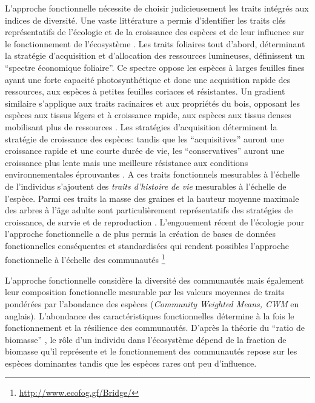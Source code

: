 \documentclass[
  11pt,
  french,
  A4paper,
  extrafontsizes,onecolumn,openright
  ]{memoir}
\begin{document}
L'approche fonctionnelle nécessite de choisir judicieusement les traits
intégrés aux indices de diversité. Une vaste littérature a permis
d'identifier les traits clés représentatifs de l'écologie et de la
croissance des espèces et de leur influence sur le fonctionnement de
l'écosystème \autocite{Reich2014}. Les traits foliaires tout d'abord,
déterminant la stratégie d'acquisition et d'allocation des ressources
lumineuses, définissent un ``spectre économique foliaire''. Ce spectre
oppose les espèces à larges feuilles fines ayant une forte capacité
photosynthétique et donc une acquisition rapide des ressources, aux
espèces à petites feuilles coriaces et résistantes. Un gradient
similaire s'applique aux traits racinaires et aux propriétés du bois,
opposant les espèces aux tissus légers et à croissance rapide, aux
espèces aux tissus denses mobilisant plus de ressources
\autocites{Chave2009}{Valverde-Barrantes2017}. Les stratégies
d'acquisition déterminent la stratégie de croissance des espèces: tandis
que les ``acquisitives'' auront une croissance rapide et une courte
durée de vie, les ``conservatives'' auront une croissance plus lente
mais une meilleure résistance aux conditions environnementales
éprouvantes \autocites{Reich1997}{Wright2004}. A ces traits fonctionnels
mesurables à l'échelle de l'individus s'ajoutent des \emph{traits
d'histoire de vie} mesurables à l'échelle de l'espèce. Parmi ces traits
la masse des graines et la hauteur moyenne maximale des arbres à l'âge
adulte sont particulièrement représentatifs des stratégies de
croissance, de survie et de reproduction
\autocites{Westoby1998}{Herault2011}. L'engouement récent de l'écologie
pour l'approche fonctionnelle a de plus permis la création de bases de
données fonctionnelles conséquentes et standardisées qui rendent
possibles l'approche fonctionnelle à l'échelle des communautés
\autocites{Kattge2011}{Perez-Harguindeguy2013} \footnote{\url{http://www.ecofog.gf/Bridge/}}

L'approche fonctionnelle considère la diversité des communautés mais
également leur composition fonctionnelle mesurable par les valeurs
moyennes de traits pondérées par l'abondance des espèces
(\emph{Community Weighted Means, CWM} en anglais). L'abondance des
caractéristiques fonctionnelles détermine à la fois le fonctionnement et
la résilience des communautés. D'après la théorie du ``ratio de
biomasse'' \autocite{Grime1998}, le rôle d'un individu dans l'écosystème
dépend de la fraction de biomasse qu'il représente et le fonctionnement
des communautés repose sur les espèces dominantes tandis que les espèces
rares ont peu d'influence.
\end{document}
